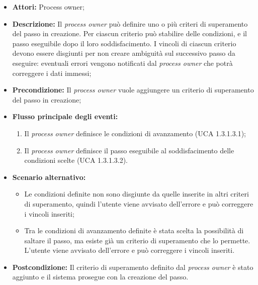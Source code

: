 \begin{itemize}
\item \textbf{Attori:} Process owner;
\item \textbf{Descrizione:}
Il \textit{process owner} può definire uno o più criteri di superamento del passo in creazione.
Per ciascun criterio può stabilire delle condizioni, e il passo eseguibile dopo il loro soddisfacimento.
I vincoli di ciascun criterio devono essere disgiunti per non creare ambiguità sul successivo passo da eseguire: eventuali errori vengono notificati dal \textit{process owner} che potrà correggere i dati immessi;
\item \textbf{Precondizione:}
Il \textit{process owner} vuole aggiungere un criterio di superamento del passo in creazione;
\item \textbf{Flusso principale degli eventi:}
\begin{enumerate}
\item Il \textit{process owner} definisce le condizioni di avanzamento (UCA 1.3.1.3.1);
\item Il \textit{process owner} definisce il passo eseguibile al soddisfacimento delle condizioni scelte (UCA 1.3.1.3.2).
\end{enumerate}
\item \textbf{Scenario alternativo:}
\begin{itemize}
\item Le condizioni definite non sono disgiunte da quelle inserite in altri criteri di superamento, quindi l'utente viene avvisato dell'errore e può correggere i vincoli inseriti;
\item Tra le condizioni di avanzamento definite è stata scelta la possibilità di saltare il passo, ma esiste già un criterio di superamento che lo permette. L'utente viene avvisato dell'errore e può correggere i vincoli inseriti.
\end{itemize}
\item \textbf{Postcondizione:}
Il criterio di superamento definito dal \textit{process owner} è stato aggiunto e il sistema prosegue con la creazione del passo.
\end{itemize}

\hypertarget{A1.3.1.3.1}{}
